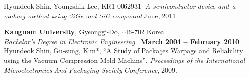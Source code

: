 \documentclass[margin,line]{mycv1}
\begin{document}
\begin{resume}
Hyundeok Shin, Youngshik Lee,  KR1-0062931: \textsl{A semiconductor device and\
a making method using SiGe and SiC compound}  June, 2011
    
\textbf{Kangnam University}, Gyeonggi-Do, 446-702 Korea \vspace{2mm}\\\vspace{1mm}%
\textsl{Bachelor's Degree in Electronic Engineering }\
\hfill \textbf{March 2004 -- February 2010}\vspace{-3mm}\\
    
Hyundeok Shin, Gu-sung, Kim*,
``A Study of Packages Warpage and Reliability using the Vacuum Compression Mold Machine'',
\textsl{Proceedings of the International Microelectronics And Packaging Society Conference},  2009.

\end{resume}
\end{document}
